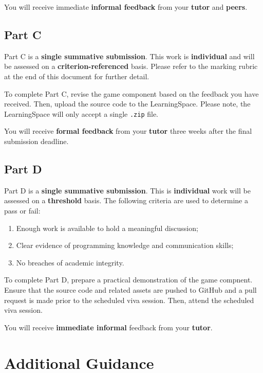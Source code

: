 \documentclass{../fal_assignment}
\begin{document}
You will receive immediate \textbf{informal feedback} from your \textbf{tutor} and \textbf{peers}.

\subsection*{Part C}

Part C is a \textbf{single summative submission}. This work is \textbf{individual} and will be assessed on a \textbf{criterion-referenced} basis. Please refer to the marking rubric at the end of this document for further detail.

To complete Part C, revise the game component based on the feedback you have received. Then, upload the source code to the LearningSpace. Please note, the LearningSpace will only accept a single \texttt{.zip} file.

You will receive \textbf{formal feedback} from your \textbf{tutor} three weeks after the final submission deadline.

\subsection*{Part D}

Part D is a \textbf{single summative submission}. This is \textbf{individual} work will be assessed on a \textbf{threshold} basis. The following criteria are used to determine a pass or fail: 

\begin{enumerate}[label=(\alph*)]
	\item Enough work is available to hold a meaningful discussion; 
	\item Clear evidence of programming knowledge and communication skills; 
	\item No breaches of academic integrity. 
\end{enumerate}

To complete Part D, prepare a practical demonstration of the game compnent. Ensure that the source code and related assets are pushed to GitHub and a pull request is made prior to the scheduled viva session. Then, attend the scheduled viva session. 

You will receive \textbf{immediate informal} feedback from your \textbf{tutor}.


\section*{Additional Guidance}
\end{document}
